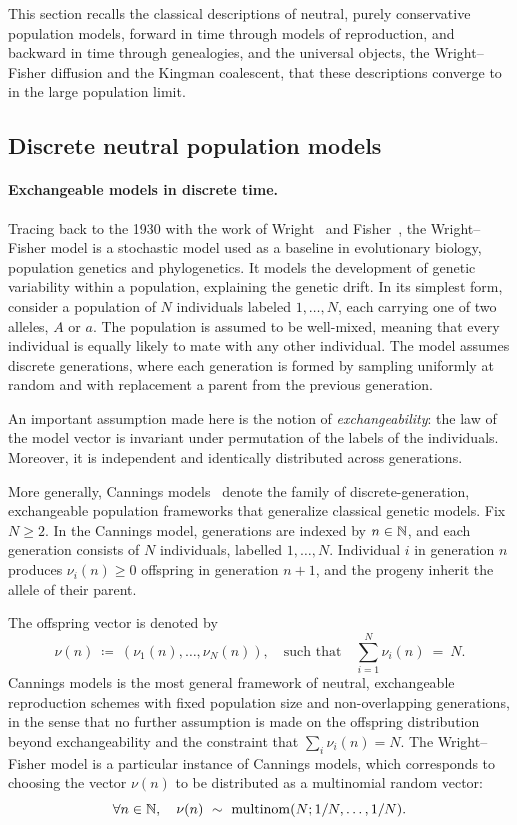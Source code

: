 \medskip

This section recalls the classical descriptions of neutral, purely conservative population models, forward in time through models of reproduction, and backward in time through genealogies, and the universal objects, the Wright--Fisher diffusion
and the Kingman coalescent, that these descriptions converge to in the large population limit.

\subsection{Discrete neutral population models}\label{sec:neutral_models}
\paragraph{Exchangeable models in discrete time.} Tracing back to the 1930 with the work of Wright~\cite{wright_evolution_1931} and Fisher~\cite{fisher_genetical_1930},
 the Wright--Fisher model is a stochastic model used as a baseline in evolutionary biology, population genetics and phylogenetics. It models the development of genetic variability within a population, explaining the genetic drift. In its simplest form, consider a population of $N$ individuals labeled $1,\dots,N$, each carrying one of two alleles, $A$ or $a$. The population is assumed to be well-mixed, meaning that every individual is equally likely to mate with any other individual. The model assumes discrete generations, where each generation is formed by sampling uniformly at random and with replacement a parent from the previous generation.

 An important assumption made here is the notion of \emph{exchangeability}: the law of the model vector is invariant under permutation of the labels of the individuals. Moreover, it is independent and identically distributed
across generations. 


 More generally, Cannings models~\cite{cannings_latent_1974,cannings_latent_1975} denote the family of discrete-generation, exchangeable population frameworks that generalize classical genetic models.
Fix $N \ge 2$. In the Cannings model, generations are indexed by $n \in \operatorname{\mathbb{N}}$,
and each generation consists of $N$ individuals, labelled $1,\dots,N$. Individual
$i$ in generation $n$ produces $\nu_i(n) \ge 0$ offspring in generation $n+1$, and the progeny inherit the allele of their parent.

The offspring vector is denoted by
\[
\nu(n)\ \coloneqq\ (\nu_1(n),\dots,\nu_N(n)),\quad \text{such that}\quad \sum_{i=1}^N \nu_i(n)\ =\ N.
\] 
Cannings models is the most general framework of neutral, exchangeable reproduction schemes with
fixed population size and non-overlapping generations, in the sense that no
further assumption is made on the offspring distribution beyond exchangeability
and the constraint that $\sum_i \nu_i(n) = N$. The Wright--Fisher model is a particular instance of Cannings models, which corresponds to choosing the vector 
$\nu(n)$ to be distributed as a multinomial random vector:
\[
\forall n\in \N,\quad \nu(n)\ \sim\ \mathrm{multinom}(N; 1/N,\dots,1/N).
\]

